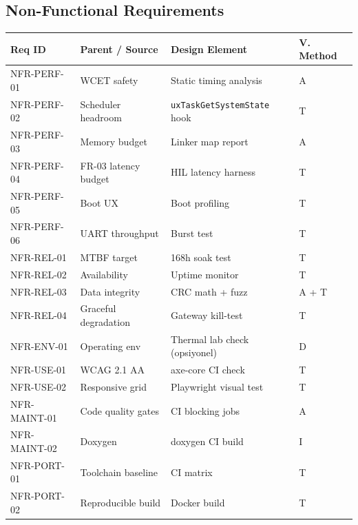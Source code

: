 \subsection{Non-Functional Requirements}
\begin{center}
\begin{tabular}{|l|l|l|l|}
\hline
\textbf{Req ID} & \textbf{Parent / Source} & \textbf{Design Element} & \textbf{V. Method} \\
\hline
NFR-PERF-01 & WCET safety & Static timing analysis & A \\
NFR-PERF-02 & Scheduler headroom & \texttt{uxTaskGetSystemState} hook & T \\
NFR-PERF-03 & Memory budget & Linker map report & A \\
NFR-PERF-04 & FR-03 latency budget & HIL latency harness & T \\
NFR-PERF-05 & Boot UX & Boot profiling & T \\
NFR-PERF-06 & UART throughput & Burst test & T \\
NFR-REL-01  & MTBF target & 168h soak test & T \\
NFR-REL-02  & Availability & Uptime monitor & T \\
NFR-REL-03  & Data integrity & CRC math + fuzz & A + T \\
NFR-REL-04  & Graceful degradation & Gateway kill-test & T \\
NFR-ENV-01  & Operating env & Thermal lab check (opsiyonel) & D \\
NFR-USE-01  & WCAG 2.1 AA & axe-core CI check & T \\
NFR-USE-02  & Responsive grid & Playwright visual test & T \\
NFR-MAINT-01 & Code quality gates & CI blocking jobs & A \\
NFR-MAINT-02 & Doxygen & doxygen CI build & I \\
NFR-PORT-01 & Toolchain baseline & CI matrix & T \\
NFR-PORT-02 & Reproducible build & Docker build & T \\
\hline
\end{tabular}
\end{center}

